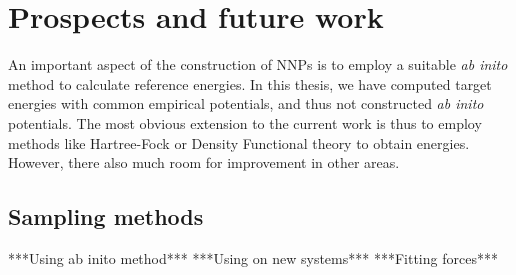 \documentclass[twoside,english]{uiofysmaster}
\begin{document}
\chapter{Prospects and future work}
An important aspect of the construction of NNPs is to employ a suitable \textit{ab inito} method to calculate reference energies.
In this thesis, we have computed target energies with common empirical potentials, and thus not constructed \textit{ab inito}
potentials. The most obvious extension to the current work is thus to employ methods like Hartree-Fock or Density Functional theory 
to obtain energies. However, there also much room for improvement in other areas. 

\section{Sampling methods}




***Using ab inito method***
***Using on new systems***
***Fitting forces***
\end{document}

